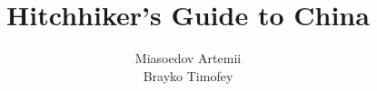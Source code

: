 \documentclass[11pt]{book}
\begin{document}
	\title{Hitchhiker's Guide to China}
	\author{Miasoedov Artemii \\ Brayko Timofey}

	\maketitle
	\tableofcontents

	

	
	
\end{document}
